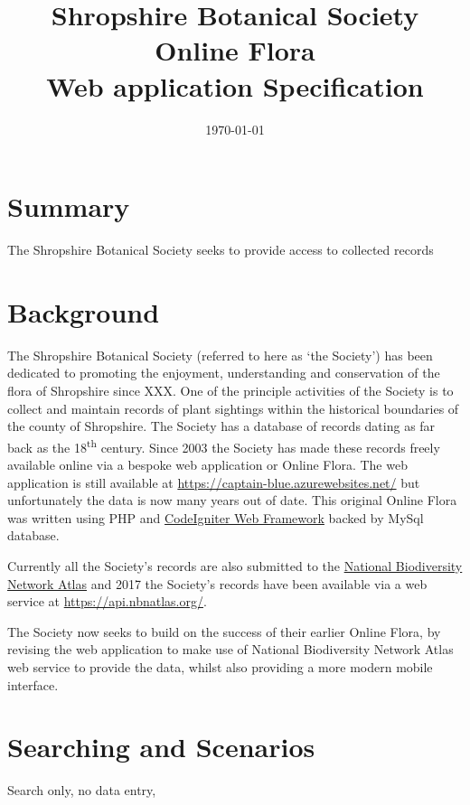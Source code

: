 \documentclass[a4paper,12pt,landscape,twocolumn]{article}
\title{Shropshire Botanical Society Online Flora\\
Web application Specification}
\author{\documentauthor}
\date{\today}
\begin{document}
\maketitle
\tableofcontents
\vfil
\pagebreak
\section{Summary}

The Shropshire Botanical Society seeks to provide access to 
collected records
\clearpage

\section{Background}

The Shropshire Botanical Society
(referred to here as `the Society')
has been dedicated to promoting the enjoyment,
understanding and conservation of the flora of Shropshire
since XXX.
One of the principle activities of the Society is to collect and maintain records 
of plant sightings within the historical boundaries of the county of Shropshire.
The Society has a database of records dating as far back as the 18\textsuperscript{th} century.
Since 2003 the Society has made these records freely available online via a bespoke web application
or Online Flora.
The web application is still available at 
\href{https://captain-blue.azurewebsites.net/}{https://captain-blue.azurewebsites.net/}
but unfortunately the data is now many years out of date.
This original Online Flora was written using
PHP and \href{https://codeigniter.com/}{CodeIgniter Web Framework}
backed by MySql database.

Currently all the Society's records are also submitted to the 
\href{https://nbnatlas.org/}{National Biodiversity Network Atlas}
and 2017 the Society's records have been available via a web service at
\href{https://api.nbnatlas.org/}{https://api.nbnatlas.org/}.

The Society now seeks to build on the success of their earlier Online Flora,
by revising the web application
to make use of National Biodiversity Network Atlas web service to provide the data,
whilst also providing a more modern mobile interface.

\section{Searching and Scenarios}

Search only, no data entry,
\end{document}
